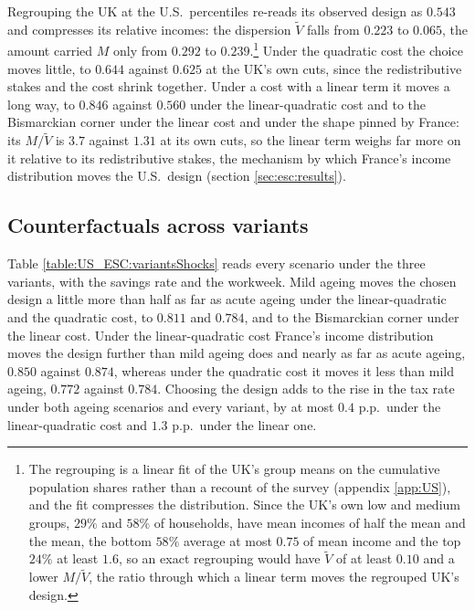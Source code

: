 

Regrouping the UK at the U.S.\ percentiles re-reads its observed design as $0.543$ and compresses its relative incomes: the dispersion $\tilde{V}$ falls from $0.223$ to $0.065$, the amount carried $M$ only from $0.292$ to $0.239$.\footnote{The regrouping is a linear fit of the UK's group means on the cumulative population shares rather than a recount of the survey (appendix \ref{app:US}), and the fit compresses the distribution. Since the UK's own low and medium groups, $29\%$ and $58\%$ of households, have mean incomes of half the mean and the mean, the bottom $58\%$ average at most $0.75$ of mean income and the top $24\%$ at least $1.6$, so an exact regrouping would have $\tilde{V}$ of at least $0.10$ and a lower $M/\tilde{V}$, the ratio through which a linear term moves the regrouped UK's design.} Under the quadratic cost the choice moves little, to $0.644$ against $0.625$ at the UK's own cuts, since the redistributive stakes and the cost shrink together. Under a cost with a linear term it moves a long way, to $0.846$ against $0.560$ under the linear-quadratic cost and to the Bismarckian corner under the linear cost and under the shape pinned by France: its $M/\tilde{V}$ is $3.7$ against $1.31$ at its own cuts, so the linear term weighs far more on it relative to its redistributive stakes, the mechanism by which France's income distribution moves the U.S.\ design (section \ref{sec:esc:results}).

\FloatBarrier
\subsection{Counterfactuals across variants}\label{app:escDetails:counterfactuals}
Table \ref{table:US_ESC:variantsShocks} reads every scenario under the three variants, with the savings rate and the workweek. Mild ageing moves the chosen design a little more than half as far as acute ageing under the linear-quadratic and the quadratic cost, to $0.811$ and $0.784$, and to the Bismarckian corner under the linear cost. Under the linear-quadratic cost France's income distribution moves the design further than mild ageing does and nearly as far as acute ageing, $0.850$ against $0.874$, whereas under the quadratic cost it moves it less than mild ageing, $0.772$ against $0.784$. Choosing the design adds to the rise in the tax rate under both ageing scenarios and every variant, by at most $0.4$ p.p.\ under the linear-quadratic cost and $1.3$ p.p.\ under the linear one.

